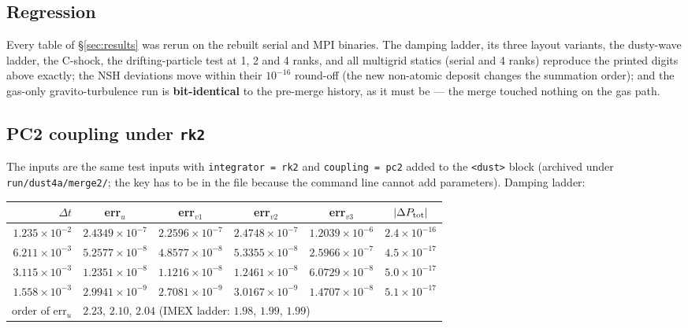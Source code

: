 \documentclass[11pt]{article}
\newcommand{\code}[1]{\texttt{#1}}
\newcommand{\file}[1]{\texttt{#1}}
\begin{document}
\subsection{Regression}

Every table of \S\ref{sec:results} was rerun on the rebuilt serial and MPI binaries.
The damping ladder, its three layout variants, the dusty-wave ladder, the C-shock,
the drifting-particle test at 1, 2 and 4 ranks, and all multigrid statics
(serial and 4 ranks) reproduce the printed digits above exactly; the NSH deviations
move within their $10^{-16}$ round-off (the new non-atomic deposit changes the
summation order); and the gas-only gravito-turbulence run is \textbf{bit-identical}
to the pre-merge history, as it must be --- the merge touched nothing on the gas path.

\subsection{PC2 coupling under \code{rk2}}

The inputs are the same test inputs with \code{integrator = rk2} and
\code{coupling = pc2} added to the \code{<dust>} block (archived under
\file{run/dust4a/merge2/}; the key has to be in the file because the command line
cannot add parameters). Damping ladder:

\begin{center}
\small
\begin{tabular}{@{}rccccc@{}}
\toprule
$\Delta t$ & err$_u$ & err$_{v1}$ & err$_{v2}$ & err$_{v3}$ & $|\Delta P_{\rm tot}|$ \\
\midrule
$1.235\times10^{-2}$ & $2.4349\times10^{-7}$ & $2.2596\times10^{-7}$ & $2.4748\times10^{-7}$ & $1.2039\times10^{-6}$ & $2.4\times10^{-16}$ \\
$6.211\times10^{-3}$ & $5.2577\times10^{-8}$ & $4.8577\times10^{-8}$ & $5.3355\times10^{-8}$ & $2.5966\times10^{-7}$ & $4.5\times10^{-17}$ \\
$3.115\times10^{-3}$ & $1.2351\times10^{-8}$ & $1.1216\times10^{-8}$ & $1.2461\times10^{-8}$ & $6.0729\times10^{-8}$ & $5.0\times10^{-17}$ \\
$1.558\times10^{-3}$ & $2.9941\times10^{-9}$ & $2.7081\times10^{-9}$ & $3.0167\times10^{-9}$ & $1.4707\times10^{-8}$ & $5.1\times10^{-17}$ \\
\midrule
order of err$_u$ & \multicolumn{5}{l}{$2.23$, $2.10$, $2.04$ \quad (IMEX ladder: $1.98$, $1.99$, $1.99$)} \\
\bottomrule
\end{tabular}
\end{center}
\end{document}
